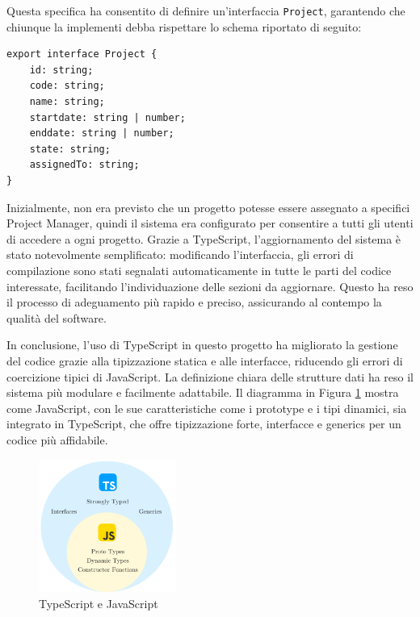 \documentclass[target=bach,aauheader=,style=]{thud}
\begin{document}
\noindent Questa specifica ha consentito di definire un'interfaccia \texttt{Project}, garantendo che chiunque la implementi debba rispettare lo schema riportato di seguito:

\begin{lstlisting}[language=React, caption=Interfaccia di progetto]
export interface Project {
    id: string;
    code: string;
    name: string;
    startdate: string | number;
    enddate: string | number;
    state: string;
    assignedTo: string;
}
\end{lstlisting}

\noindent Inizialmente, non era previsto che un progetto potesse essere assegnato a specifici Project Manager, quindi il sistema era configurato per consentire a tutti gli utenti di accedere a ogni progetto. Grazie a TypeScript, l'aggiornamento del sistema è stato notevolmente semplificato: modificando l'interfaccia, gli errori di compilazione sono stati segnalati automaticamente in tutte le parti del codice interessate, facilitando l'individuazione delle sezioni da aggiornare. Questo ha reso il processo di adeguamento più rapido e preciso, assicurando al contempo la qualità del software.

\noindent In conclusione, l'uso di TypeScript in questo progetto ha migliorato la gestione del codice grazie alla tipizzazione statica e alle interfacce, riducendo gli errori di coercizione tipici di JavaScript. La definizione chiara delle strutture dati ha reso il sistema più modulare e facilmente adattabile. Il diagramma in Figura \ref{ts_and_js} mostra come JavaScript, con le sue caratteristiche come i prototype e i tipi dinamici, sia integrato in TypeScript, che offre tipizzazione forte, interfacce e generics per un codice più affidabile.

\begin{figure}[H]
    \centering
    \includegraphics[width=0.4\textwidth]{img/typescript_and_javascript.pdf} 
    \caption{TypeScript e JavaScript}
    \label{ts_and_js}
\end{figure}
\end{document}
